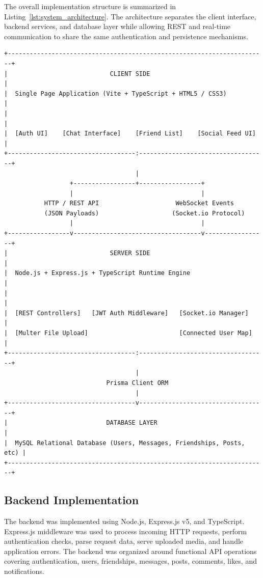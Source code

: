 \documentclass[12pt, a4paper]{article}
\begin{document}
The overall implementation structure is summarized in Listing~\ref{lst:system_architecture}. The architecture separates the client interface, backend services, and database layer while allowing REST and real-time communication to share the same authentication and persistence mechanisms.

\begin{lstlisting}[basicstyle=\ttfamily\tiny, caption={Nextalk High-Level Decoupled Architecture Layout}, label={lst:system_architecture}]
+-----------------------------------------------------------------------+
|                            CLIENT SIDE                                |
|  Single Page Application (Vite + TypeScript + HTML5 / CSS3)           |
|                                                                       |
|  [Auth UI]    [Chat Interface]    [Friend List]    [Social Feed UI]   |
+-----------------------------------:-----------------------------------+
                                    |
                  +-----------------+-----------------+
                  |                                   |
           HTTP / REST API                     WebSocket Events
           (JSON Payloads)                    (Socket.io Protocol)
                  |                                   |
+-----------------v-----------------------------------v-----------------+
|                            SERVER SIDE                                |
|  Node.js + Express.js + TypeScript Runtime Engine                     |
|                                                                       |
|  [REST Controllers]   [JWT Auth Middleware]   [Socket.io Manager]    |
|  [Multer File Upload]                         [Connected User Map]    |
+-----------------------------------:-----------------------------------+
                                    |
                            Prisma Client ORM
                                    |
+-----------------------------------v-----------------------------------+
|                           DATABASE LAYER                              |
|  MySQL Relational Database (Users, Messages, Friendships, Posts, etc) |
+-----------------------------------------------------------------------+
\end{lstlisting}


\subsection{Backend Implementation}

The backend was implemented using Node.js, Express.js v5, and TypeScript. Express.js middleware was used to process incoming HTTP requests, perform authentication checks, parse request data, serve uploaded media, and handle application errors. The backend was organized around functional API operations covering authentication, users, friendships, messages, posts, comments, likes, and notifications.
\end{document}
